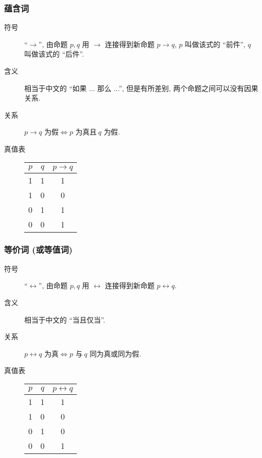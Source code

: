 \documentclass[
    mode=hazy,
    color=blue,
    device=normal,
    lang=cn
]{elegantnote}
\begin{document}
            \subsubsection{蕴含词}
                \begin{description}
                    \item[符号] ``$\to$'', 由命题 $p,q$ 用 $\to$ 连接得到新命题 $p\to q$, $p$ 叫做该式的 ``前件'', $q$ 叫做该式的 ``后件''.
                    \item[含义] 相当于中文的 ``如果 ... 那么 ...'', 但是有所差别, 两个命题之间可以没有因果关系.
                    \item[关系] $p\to q\text{ 为假}\Leftrightarrow p\text{ 为真且}\ q\text{ 为假}$.  
                    \item[真值表]
                    \begin{tabular}{c|c|c}
                        $p$ & $q$ & $p\to q$\\
                        \hline
                        1 & 1 & 1\\
                        1 & 0 & 0\\
                        0 & 1 & 1\\
                        0 & 0 & 1
                    \end{tabular} 
                \end{description}
            \subsubsection{等价词 (或等值词)}
                \begin{description}
                    \item[符号] ``$\leftrightarrow$'', 由命题 $p,q$ 用 $\leftrightarrow$ 连接得到新命题 $p\leftrightarrow q$.
                    \item[含义] 相当于中文的 ``当且仅当''.
                    \item[关系] $p\leftrightarrow q\text{ 为真}\Leftrightarrow p\text{ 与}\ q\text{ 同为真或同为假}$.   
                    \item[真值表]
                    \begin{tabular}{c|c|c}
                        $p$ & $q$ & $p\leftrightarrow q$\\
                        \hline
                        1 & 1 & 1\\
                        1 & 0 & 0\\
                        0 & 1 & 0\\
                        0 & 0 & 1
                    \end{tabular}  
                \end{description}
\end{document}
